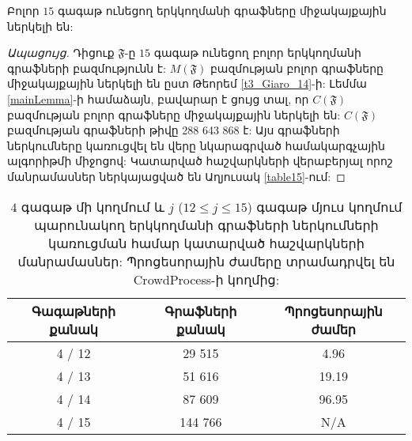 \begin{hide}
\begin{theorem}
\label{th15}
Բոլոր $15$ գագաթ ունեցող երկկողմանի գրաֆները միջակայքային ներկելի են:
\end{theorem}
\begin{proof}[Ապացույց]
Դիցուք $\mathfrak{F}$-ը $15$ գագաթ ունեցող բոլոր երկկողմանի գրաֆների բազմությունն է: $M(\mathfrak{F})$ բազմության բոլոր գրաֆները միջակայքային ներկելի են ըստ Թեորեմ \ref{t3_Giaro_14}-ի: Լեմմա \ref{mainLemma}-ի համաձայն, բավարար է ցույց տալ, որ $C(\mathfrak{F})$ բազմության բոլոր գրաֆները միջակայքային ներկելի են: $C(\mathfrak{F})$ բազմության գրաֆների թիվը 288 643 868 է: Այս գրաֆների ներկումները կառուցվել են վերը նկարագրված համակարգչային ալգորիթմի միջոցով: Կատարված հաշվարկների վերաբերյալ որոշ մանրամասներ ներկայացված են Աղյուսակ \ref{table15}-ում:
\end{proof}
\begin{table}[t]
\renewcommand{\arraystretch}{1.2}
\begin{center}
\begin{tabular}{|c|c|c|}
\hline
Գագաթների քանակ & Գրաֆների քանակ & Պրոցեսորային ժամեր \\
\hline
4 / 12 & 29 515 & 4.96 \\
\hline
4 / 13 & 51 616 & 19.19 \\
\hline
4 / 14 & 87 609 & 96.95\\
\hline
4 / 15 & 144 766 & N/A \\
\hline
\end{tabular}
\end{center}
\caption{$4$ գագաթ մի կողմում և $j$ ($12 \leq j \leq 15$) գագաթ մյուս կողմում պարունակող երկկողմանի գրաֆների ներկումների կառուցման համար կատարված հաշվարկների մանրամասներ: Պրոցեսորային ժամերը տրամադրվել են CrowdProcess-ի կողմից:}\label{table4x}
\end{table}


\end{hide}
